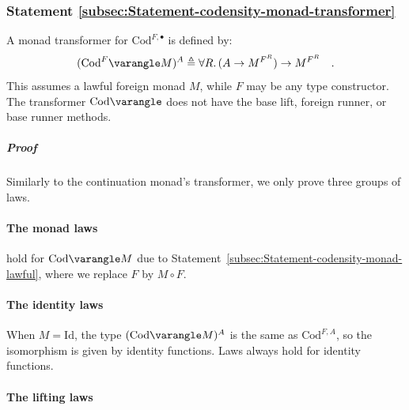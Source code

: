 \subsubsection{Statement \label{subsec:Statement-codensity-monad-transformer}\ref{subsec:Statement-codensity-monad-transformer}}

A monad transformer for $\text{Cod}^{F,\bullet}$ is defined by:
\[
(\text{Cod}^{F}\varangle M)^{A}\triangleq\forall R.\,(A\rightarrow M^{F^{R}})\rightarrow M^{F^{R}}\quad.
\]
This assumes a lawful foreign monad $M$, while $F$ may be any type
constructor. The transformer $\text{Cod}\varangle$ does not have
the base lift, foreign runner, or base runner methods.

\subparagraph{Proof }

Similarly to the continuation monad\textsf{'}s transformer, we only prove three
groups of laws.

\paragraph{The monad laws}

hold for $\text{Cod}\varangle M$ due to Statement~\ref{subsec:Statement-codensity-monad-lawful},
where we replace $F$ by $M\circ F$.

\paragraph{The identity laws}

When $M=\text{Id}$, the type $(\text{Cod}\varangle M)^{A}$ is the
same as $\text{Cod}^{F,A}$, so the isomorphism is given by identity
functions. Laws always hold for identity functions.

\paragraph{The lifting laws}

